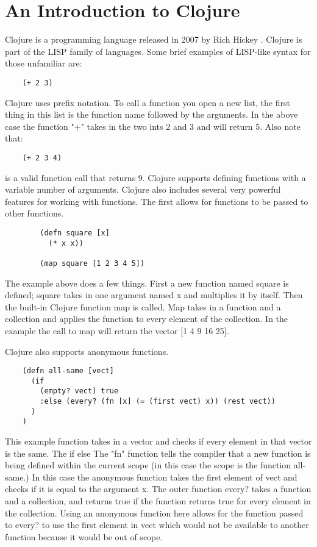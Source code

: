 \documentclass[12pt]{article}
\begin{document}
\section{An Introduction to Clojure}\label{sec:intro}
	Clojure is a programming language released in 2007 by Rich Hickey \cite{wiki}. 
Clojure is part of the LISP family of languages. Some brief examples of LISP-like syntax for those unfamiliar  are:
	\begin{verbatim}
	(+ 2 3)
	\end{verbatim}
	Clojure uses prefix notation. To call a function you open a new list, the first thing in this list is the function name followed by the arguments. In the above case the function "+" takes in the two ints 2 and 3 and will return 5. Also note that:
	\begin{verbatim}
	(+ 2 3 4)
	\end{verbatim}
	is a valid function call that returns 9. Clojure supports defining functions with a variable number of arguments. Clojure also includes several very powerful features for working with functions. The first allows for functions to be passed to other functions. 
	\begin{verbatim}
		(defn square [x] 
		  (* x x))
		
		(map square [1 2 3 4 5])
	\end{verbatim}
	The example above does a few things. First a new function named square is defined; square takes in one argument named x and multiplies it by itself. Then the built-in Clojure function map is called. Map takes in a function and a collection and applies the function to every element of the collection. In the example the call to map will return the vector [1 4 9 16 25]. 
	
	Clojure also supports anonymous functions.  
	\begin{verbatim}
	(defn all-same [vect]
      (if 
        (empty? vect) true
        :else (every? (fn [x] (= (first vect) x)) (rest vect)) 
      )
    )
	\end{verbatim}
	This example function takes in a vector and checks if every element in that vector is the same. The if else  The "fn" function tells the compiler that a new function is being defined within the current scope (in this case the scope is the function all-same.) In this case the anonymous function takes the first element of vect and checks if it is equal to the argument x. The outer function every? takes a function and a collection, and returns true if the function returns true for every element in the collection. Using an anonymous function here allows for the function passed to every? to use the first element in vect which would not be available to another function because it would be out of scope. 
\end{document}
